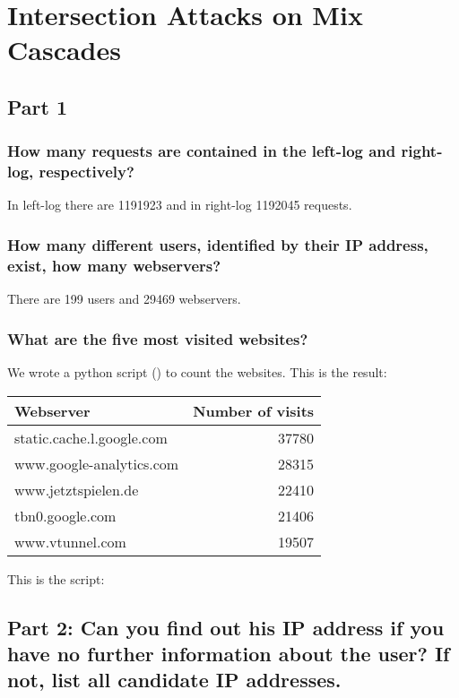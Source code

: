 \section{Intersection Attacks on Mix Cascades}

\subsection{Part 1}

\subsubsection{How many requests are contained in the left-log and right-log, respectively?}

In left-log there are 1191923 and in right-log 1192045 requests.

\subsubsection{How many different users, identified by their IP address, exist, how many webservers?}

There are 199 users and 29469 webservers.

\subsubsection{What are the five most visited websites?} 

We wrote a python script () to count the websites. This is the result:\\

\begin{tabular}{l r}
	Webserver & Number of visits\\
	\hline
	static.cache.l.google.com & 37780\\
	www.google-analytics.com & 28315\\
	www.jetztspielen.de & 22410\\
	tbn0.google.com & 21406\\
	www.vtunnel.com & 19507\\
\end{tabular}


This is the script:



\subsection{Part 2: Can you find out his IP address if you have no further information about the user? If not, list all candidate IP addresses.}


